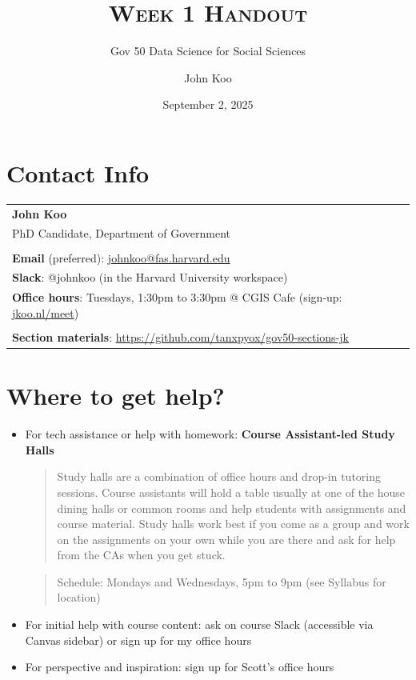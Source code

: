 \documentclass[
  11pt,
  letterpaper]{article}
\title{\textsc{Week 1 Handout}}
\subtitle{Gov 50 Data Science for Social Sciences}
\author{John Koo}
\date{September 2, 2025}
\begin{document}
\maketitle

\section{Contact Info}\label{contact-info}

\begin{table}[!h]

\centering

\begin{tabular}{l}
  \textbf{John Koo} \\
  PhD Candidate, Department of Government \\ \\
  
  \textbf{Email} (preferred): \href{mailto:johnkoo@fas.harvard.edu}{johnkoo@fas.harvard.edu} \\
  \textbf{Slack}: @johnkoo (in the Harvard University workspace) \\
  \textbf{Office hours}: Tuesdays, 1:30pm to 3:30pm @ CGIS Cafe (sign-up: \href{https://jkoo.nl/meet}{jkoo.nl/meet}) \\ \\ 
  \textbf{Section materials}: \url{https://github.com/tanxpyox/gov50-sections-jk}
  
  \end{tabular}
\end{table}

\section{Where to get help?}\label{where-to-get-help}

\begin{itemize}
\item
  For tech assistance or help with homework: \textbf{Course
  Assistant-led Study Halls}

  \begin{quote}
  Study halls are a combination of office hours and drop-in tutoring
  sessions. Course assistants will hold a table usually at one of the
  house dining halls or common rooms and help students with assignments
  and course material. Study halls work best if you come as a group and
  work on the assignments on your own while you are there and ask for
  help from the CAs when you get stuck.
  \end{quote}

  \begin{quote}
  Schedule: Mondays and Wednesdays, 5pm to 9pm (see Syllabus for
  location)
  \end{quote}
\item
  For initial help with course content: ask on course Slack (accessible
  via Canvas sidebar) or sign up for my office hours
\item
  For perspective and inspiration: sign up for Scott's office hours
\end{itemize}
\end{document}
